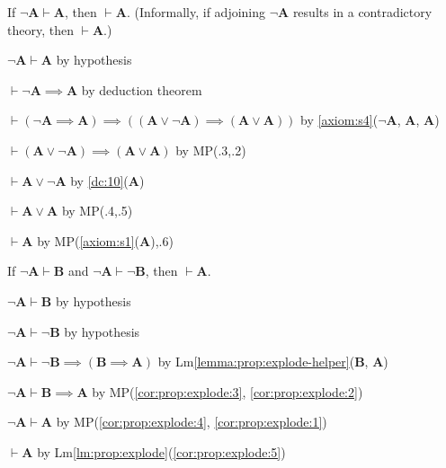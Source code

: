 \documentclass{amsart}%
\newcommand\metavariable[1]{\boldsymbol{#1}}
\begin{document}
\begin{lemma}\label{lm:prop:explode}
If $\neg\metavariable{A}\vdash\metavariable{A}$, then $\vdash\metavariable{A}$.
(Informally, if adjoining $\neg\metavariable{A}$ results in a
contradictory theory, then $\vdash\metavariable{A}$.)
\end{lemma}

\begin{pf}
\item $\neg\metavariable{A}\vdash\metavariable{A}$ by hypothesis
\item $\vdash\neg\metavariable{A}\implies\metavariable{A}$ by deduction theorem
\item $\vdash(\neg\metavariable{A}\implies\metavariable{A})\implies((\metavariable{A}\lor\neg\metavariable{A})\implies(\metavariable{A}\lor\metavariable{A}))$
  by \ref{axiom:s4}($\neg\metavariable{A}$, $\metavariable{A}$, $\metavariable{A}$)
\item $\vdash(\metavariable{A}\lor\neg\metavariable{A})\implies(\metavariable{A}\lor\metavariable{A})$
  by MP(.3,.2)
\item $\vdash\metavariable{A}\lor\neg\metavariable{A}$ by \ref{dc:10}($\metavariable{A}$)
\item $\vdash\metavariable{A}\lor\metavariable{A}$ by MP(.4,.5)
\item $\vdash\metavariable{A}$ by MP(\ref{axiom:s1}($\metavariable{A}$),.6)
\end{pf}

\begin{dc}\label{dc:15}
If $\neg\metavariable{A}\vdash\metavariable{B}$ and
$\neg\metavariable{A}\vdash\neg\metavariable{B}$, then
$\vdash\metavariable{A}$.
\end{dc}

\begin{pf} 
\item\label{cor:prop:explode:1} $\neg\metavariable{A}\vdash\metavariable{B}$
  by hypothesis
\item\label{cor:prop:explode:2} $\neg\metavariable{A}\vdash\neg\metavariable{B}$
  by hypothesis
\item\label{cor:prop:explode:3} $\neg\metavariable{A}\vdash\neg\metavariable{B}\implies(\metavariable{B}\implies\metavariable{A})$
  by Lm\ref{lemma:prop:explode-helper}($\metavariable{B}$, $\metavariable{A}$)
\item\label{cor:prop:explode:4} $\neg\metavariable{A}\vdash\metavariable{B}\implies\metavariable{A}$
  by MP(\ref{cor:prop:explode:3}, \ref{cor:prop:explode:2})
\item\label{cor:prop:explode:5} $\neg\metavariable{A}\vdash\metavariable{A}$
  by MP(\ref{cor:prop:explode:4}, \ref{cor:prop:explode:1})
\item\label{cor:prop:explode:6} $\vdash\metavariable{A}$ by Lm\ref{lm:prop:explode}(\ref{cor:prop:explode:5})
\end{pf}
\end{document}
